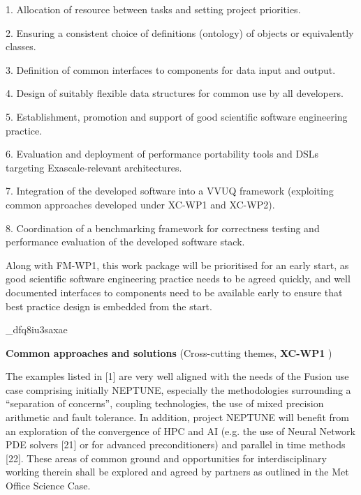 \documentclass{article}
\begin{document}
\vspace{14pt}
\leftskip=0pt
1. Allocation of resource between tasks and setting project priorities.

\vspace{2pt}
2. Ensuring a consistent choice of definitions (ontology) of objects or equivalently 
classes.

\vspace{2pt}
3. Definition of common interfaces to components for data input and output. 

\vspace{2pt}
4. Design of suitably flexible data structures for common use by all developers.

\vspace{2pt}
5. Establishment, promotion and support of good scientific software engineering 
practice.

\vspace{2pt}
6. Evaluation and deployment of performance portability tools and DSLs targeting 
Exascale-relevant architectures.

\vspace{2pt}
7. Integration of the developed software into a VVUQ framework (exploiting common 
approaches developed under XC-WP1 and XC-WP2).

\vspace{2pt}
8. Coordination of a benchmarking framework for correctness testing and performance 
evaluation of the developed software stack.

\vspace{14pt}
\leftskip=-14pt
Along with FM-WP1, this work package will be prioritised for an early start, as 
good scientific software engineering practice needs to be agreed quickly, and well 
documented interfaces to components need to be available early to ensure that best 
practice design is embedded from the start.\label{}

\vspace{2pt}
\_dfq8iu3saxae

\vspace{2pt}
{\color{color25} \textbf{Common approaches and solutions }}{\color{color25} (Cross-cutting 
themes, }{\color{color25} \textbf{XC-WP1}}{\color{color25} )}

\vspace{14pt}
{\color{color29} The examples listed in [1] are very well aligned with the needs 
of the Fusion use case comprising initially NEPTUNE, especially the methodologies 
surrounding a ``separation of concerns'', coupling technologies, the use of mixed 
precision arithmetic and fault tolerance. In addition, project NEPTUNE will benefit 
from an exploration of the convergence of HPC and AI (e.g. the use of Neural Network 
PDE solvers [21] or for advanced preconditioners) and parallel in time methods 
[22]. These areas of common ground and opportunities for interdisciplinary working 
therein shall be explored and agreed by partners as outlined in the Met Office 
Science Case.}
\end{document}
